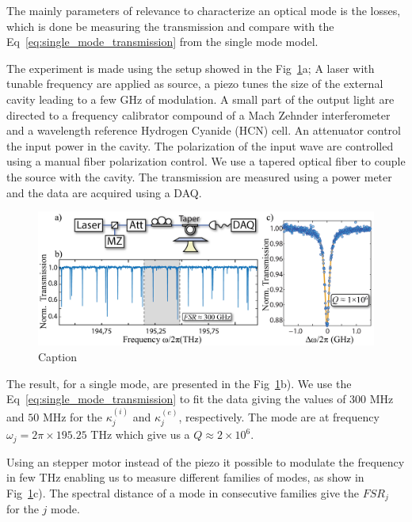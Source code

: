 The mainly parameters of relevance to characterize an optical mode is the losses, which is done be measuring the transmission and compare with the Eq~\ref{eq:single_mode_transmission} from the single mode model. 

The experiment is made using the setup showed in the  Fig~\ref{fig:exp_mode_charac}a; A laser with tunable frequency are applied as source, a piezo tunes the size of the external cavity leading to a few GHz of modulation. A small part of the output light are directed to a frequency calibrator compound of a Mach Zehnder interferometer and a wavelength reference Hydrogen Cyanide (HCN) cell. An attenuator control the input power in the cavity. The polarization of the input wave are controlled using a manual fiber polarization control. We use a tapered optical fiber to couple the source with the cavity. The transmission are measured using a power meter and the data are acquired using a DAQ. 
\begin{figure}[h!]
    \centering
    \includegraphics[width = 16cm]{figuras/Dissertation_optical_char_exp.jpg}
    \caption{Caption}
    \label{fig:exp_mode_charac}
\end{figure}

The result, for a single mode, are presented in the Fig~\ref{fig:exp_mode_charac}b). We use the Eq~\ref{eq:single_mode_transmission} to fit the data giving the values of $300$ MHz and $50$ MHz for the $\kappa_j^{(i)}$ and $\kappa_j^{(e)}$, respectively. The mode are at frequency $\omega_j = 2\pi\times195.25$ THz which give us a $Q \approx 2\times10^6$.

Using an stepper motor instead of the piezo it possible to modulate the frequency in few THz enabling us to measure different families of modes, as show in Fig~\ref{fig:exp_mode_charac}c). The spectral distance of a mode in consecutive families give the $FSR_j$ for the $j$ mode. 










